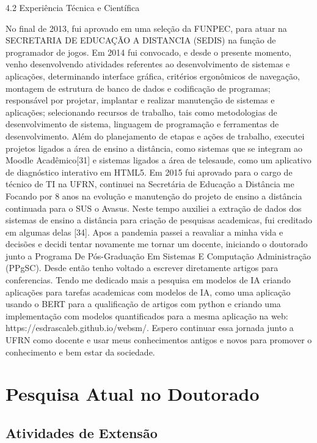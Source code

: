 \documentclass[10pt,a4paper,oneside]{book}
\begin{document}
4.2      Experiência Técnica e Científica

No final de 2013, fui aprovado em uma seleção da FUNPEC, para atuar na SECRETARIA DE EDUCAÇÃO A DISTANCIA (SEDIS) na função de programador de jogos. Em 2014 fui convocado, e desde o presente momento, venho desenvolvendo atividades referentes ao desenvolvimento de sistemas e aplicações, determinando interface gráfica, critérios ergonômicos de navegação, montagem de estrutura de banco de dados e codificação de programas; responsável por projetar, implantar e realizar manutenção de sistemas e aplicações; selecionando recursos de trabalho, tais como metodologias de desenvolvimento de sistema, linguagem de programação e ferramentas de desenvolvimento.
Além do planejamento de etapas e ações de trabalho, executei projetos ligados a área de ensino a distância, como sistemas que se integram ao Moodle Acadêmico[31] e sistemas ligados a área de telesaude, como um aplicativo de diagnóstico interativo em HTML5.
Em 2015 fui aprovado para o cargo de técnico de TI na UFRN, continuei na Secretária de Educação a Distância me Focando por 8 anos na evolução e manutenção do projeto de ensino a distância continuada para o SUS o Avasus. Neste tempo auxiliei a extração de dados dos sistemas de ensino a distância para criação de pesquisas academicas, fui creditado em algumas delas [34].
Apos a pandemia passei a reavaliar a minha vida e decisões e decidi tentar novamente me tornar um docente, iniciando o doutorado junto a Programa De Pós-Graduação Em Sistemas E Computação Administração (PPgSC). Desde então tenho voltado a escrever diretamente artigos para conferencias. Tendo me dedicado mais a pesquisa em modelos de IA criando aplicações para tarefas academicas com modelos de IA, como uma aplicação usando o BERT para a qualificação de artigos com python e criando uma implementação com modelos quantificados para a mesma aplicação na web: https://esdrascaleb.github.io/websm/.
Espero continuar essa jornada junto a UFRN como docente e usar meus conhecimentos antigos e novos para promover o conhecimento e bem estar da sociedade.




\chapter{Pesquisa Atual no Doutorado}
\label{cap_pesquisa}


\section{Atividades de Extensão}
\end{document}
